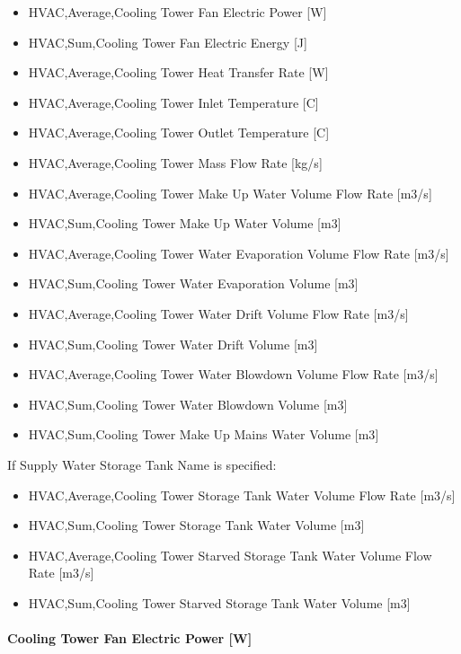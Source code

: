 \begin{itemize}
\item
  HVAC,Average,Cooling Tower Fan Electric Power {[}W{]}
\item
  HVAC,Sum,Cooling Tower Fan Electric Energy {[}J{]}
\item
  HVAC,Average,Cooling Tower Heat Transfer Rate {[}W{]}
\item
  HVAC,Average,Cooling Tower Inlet Temperature {[}C{]}
\item
  HVAC,Average,Cooling Tower Outlet Temperature {[}C{]}
\item
  HVAC,Average,Cooling Tower Mass Flow Rate {[}kg/s{]}
\item
  HVAC,Average,Cooling Tower Make Up Water Volume Flow Rate {[}m3/s{]}
\item
  HVAC,Sum,Cooling Tower Make Up Water Volume {[}m3{]}
\item
  HVAC,Average,Cooling Tower Water Evaporation Volume Flow Rate {[}m3/s{]}
\item
  HVAC,Sum,Cooling Tower Water Evaporation Volume {[}m3{]}
\item
  HVAC,Average,Cooling Tower Water Drift Volume Flow Rate {[}m3/s{]}
\item
  HVAC,Sum,Cooling Tower Water Drift Volume {[}m3{]}
\item
  HVAC,Average,Cooling Tower Water Blowdown Volume Flow Rate {[}m3/s{]}
\item
  HVAC,Sum,Cooling Tower Water Blowdown Volume {[}m3{]}
\item
  HVAC,Sum,Cooling Tower Make Up Mains Water Volume {[}m3{]}
\end{itemize}

If Supply Water Storage Tank Name is specified:

\begin{itemize}
\item
  HVAC,Average,Cooling Tower Storage Tank Water Volume Flow Rate {[}m3/s{]}
\item
  HVAC,Sum,Cooling Tower Storage Tank Water Volume {[}m3{]}
\item
  HVAC,Average,Cooling Tower Starved Storage Tank Water Volume Flow Rate {[}m3/s{]}
\item
  HVAC,Sum,Cooling Tower Starved Storage Tank Water Volume {[}m3{]}
\end{itemize}

\paragraph{Cooling Tower Fan Electric Power {[}W{]}}\label{cooling-tower-fan-electric-power-w-5}

